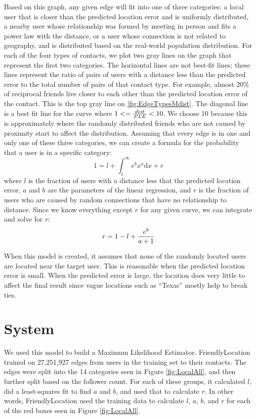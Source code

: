 Based on this graph, any given edge will fit into one of three categories: a local user that is closer than the predicted location error and is uniformly distributed, a nearby user whose relationship was formed by meeting in person and fits a power law with the distance, or a user whose connection is not related to geography, and is distributed based on the real-world population distribution.
For each of the four types of contacts, we plot two gray lines on the graph that represent the first two categories.
The horizontal lines are not best-fit lines; these lines represent the ratio of pairs of users with a distance less than the predicted error to the total number of pairs of that contact type. 
For example, almost 20\% of reciprocal friends live closer to each other than
the predicted location error of the contact. This is the top gray line on
\ref{fig:EdgeTypesMdist}.
The diagonal line is a best fit line for the curve where
\begin{math}1<={dist \over PLE}<10\end{math}.
We choose 10 because this is approximately where the randomly distributed friends who are not caused by proximity start to affect the distribution.
Assuming that every edge is in one and only one of these three categories, we can create a formula for the probability that a user is in a specific category:
\begin{displaymath}1=l+\int_{1}^{\infty}e^{b}x^{a}\mathrm{d}x+r\end{displaymath}
where \(l\) is the fraction of users with a distance less that the predicted
location error, \(a\) and \(b\) are the parameters of the linear regression,
and \(r\) is the fraction of users who are caused by random connections that
have no relationship to distance.
Since we know everything except \(r\) for any given curve, we can integrate and solve for \(r\):
\begin{displaymath}r=1-l+{e^{b} \over a+1}\end{displaymath}

When this model is created, it assumes that none of the randomly located users
are located near the target user.
This is reasonable when the predicted location error is small.
When the predicted error is large, the location does very little to affect the
final result since vague locations such as ``Texas'' mostly help to break ties.

\section{System}
We used this model to build a Maximum Likelihood Estimator.
FriendlyLocation trained on 27,251,927 edges from users in the training set to their contacts.
The edges were split into the 14 categories seen in Figure \ref{fig:LocalAll}, and
then further split based on the follower count. For each of these groups, it
calculated \(l\), did a least-squares fit to find \(a\) and \(b\), and used
that to calculate \(r\).
In other words, FriendlyLocation used the training data to calculate \(l\),
\(a\), \(b\), and \(r\) for each of the red boxes seen in Figure
\ref{fig:LocalAll}.

